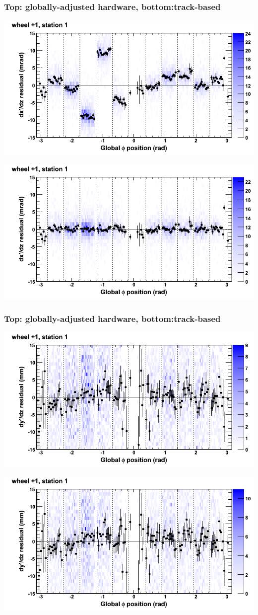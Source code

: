 \documentclass[compress]{beamer}
\begin{document}
\begin{frame}
\frametitle{Top: globally-adjusted hardware, bottom:track-based}
\includegraphics[width=0.7\linewidth]{NOV4_mapplots_HW/DTvsphi_st1whD_dxdz.png}

\includegraphics[width=0.7\linewidth]{NOV4_mapplots/DTvsphi_st1whD_dxdz.png}
\end{frame}

\begin{frame}
\frametitle{Top: globally-adjusted hardware, bottom:track-based}
\includegraphics[width=0.7\linewidth]{NOV4_mapplots_HW/DTvsphi_st1whD_dydz.png}

\includegraphics[width=0.7\linewidth]{NOV4_mapplots/DTvsphi_st1whD_dydz.png}
\end{frame}
\end{document}
